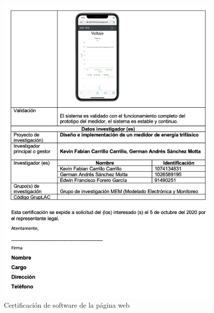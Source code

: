 \begin{appendix}
\begin{figure}[H]
    \includegraphics[width = 14cm]{Anexos/front-3.png}
    \caption{Certificación de software de la página web} 
    \label{fig:front3}
\end{figure}




\end{appendix}
